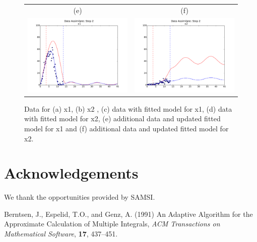\documentclass[11pt,twoside]{article}
\numberwithin{equation}{section}
\begin{document}
\begin{figure}[ht!]
\begin{center}
\begin{tabular}{c c}
    (e) & (f) \\
    \includegraphics[width=3in]{DSStep2x1.pdf} &
    \includegraphics[width=3in]{DSStep2x2.pdf} \\
      \end{tabular}
  \end{center}\caption{ Data for (a) x1, (b) x2 , (c) data with fitted model for x1, (d) data with fitted model for x2, (e) additional data and updated fitted model for x1 and (f) additional data and updated fitted model for x2.}\label{fig:Example1}
\end{figure}



\section*{Acknowledgements}
We thank the opportunities provided by SAMSI. 

\begin{thebibliography}{}
Berntsen, J., Espelid, T.O., and Genz, A. (1991) An Adaptive Algorithm for the Approximate Calculation 
of Multiple Integrals, {\it ACM Transactions on Mathematical Software}, {\bf 17}, 437--451.
\end{thebibliography}
\end{document}
